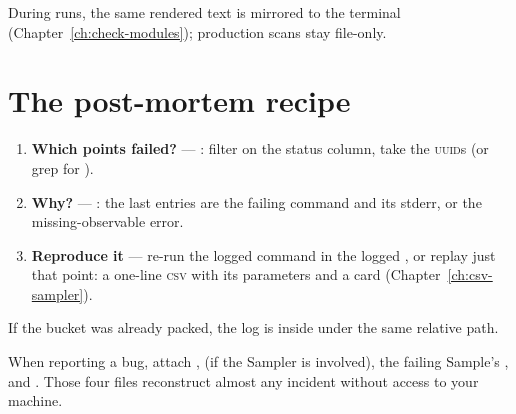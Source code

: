 During  runs, the same rendered text is mirrored to the terminal
(Chapter~\ref{ch:check-modules}); production scans stay file-only.

\section{The post-mortem recipe}
\label{sec:postmortem}

\begin{enumerate}
  \item \textbf{Which points failed?} --- : filter on the status
        column, take the \textsc{uuid}s (or grep  for
        ).
  \item \textbf{Why?} --- : the last
        entries are the failing command and its stderr, or the missing-observable
        error.
  \item \textbf{Reproduce it} --- re-run the logged command in the logged ,
        or replay just that point: a one-line \textsc{csv} with its parameters and
         a  card (Chapter~\ref{ch:csv-sampler}).
\end{enumerate}

If the bucket was already packed, the log is inside  under the
same relative path.

\begin{jtip}
When reporting a bug, attach ,  (if the Sampler is
involved), the failing Sample's , and
. Those four files reconstruct almost any incident without
access to your machine.
\end{jtip}
